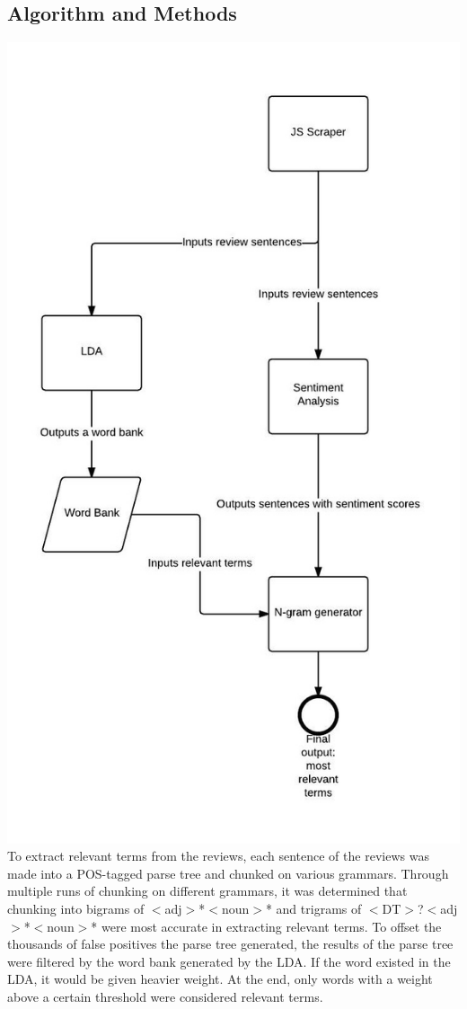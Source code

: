 \documentclass{article}
\begin{document}
\subsection{Algorithm and Methods}
\includegraphics[scale = 0.4]{flowchart.jpg} \\
To extract relevant terms from the reviews, each sentence of the reviews was made into a POS-tagged parse tree and chunked on various grammars. Through multiple runs of chunking on different grammars, it was determined that chunking into bigrams of $<$adj$>$*$<$noun$>$* and trigrams of $<$DT$>$?$<$adj$>$*$<$noun$>$* were most accurate in extracting relevant terms. To offset the thousands of false positives the parse tree generated, the results of the parse tree were filtered by the word bank generated by the LDA. If the word existed in the LDA, it would be given heavier weight. At the end, only words with a weight above a certain threshold were considered relevant terms. \\\\
\end{document}
